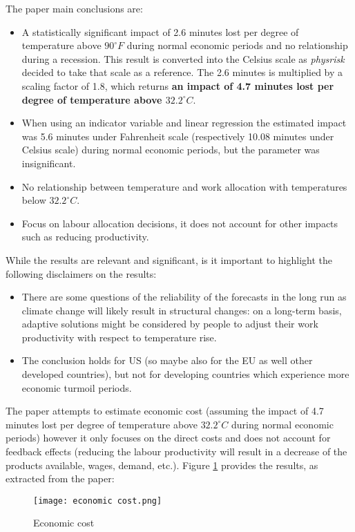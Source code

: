 \documentclass{article}
\begin{document}
The paper main conclusions are:
\begin{itemize}
    \item A statistically significant impact of 2.6 minutes lost per degree of temperature above $90^\circ F$ during normal economic periods and no relationship during a recession. This result is converted into the Celsius scale as \emph{physrisk} decided to take that scale as a reference. The 2.6 minutes is multiplied by a scaling factor of 1.8, which returns \textbf{an impact of 4.7 minutes lost per degree of temperature above $32.2^\circ C$}. 
    \item When using an indicator variable and linear regression the estimated impact was 5.6 minutes under Fahrenheit scale (respectively 10.08 minutes under Celsius scale) during normal economic periods, but the parameter was insignificant. 
    \item No relationship between temperature and work allocation with temperatures below  $32.2^\circ C$. 
    \item Focus on labour allocation decisions, it does not account for other impacts such as reducing productivity. 
\end{itemize}

While the results are relevant and significant, is it important to highlight the following disclaimers on the results:
\begin{itemize}
    \item There are some questions of the reliability of the forecasts in the long run as climate change will likely result in structural changes: on a long-term basis, adaptive solutions might be considered by people to adjust their work productivity with respect to temperature rise.
    \item The conclusion holds for US (so maybe also for the EU as well other developed countries), but not for developing countries which experience more economic turmoil periods.
\end{itemize}

The paper attempts to estimate economic cost (assuming the impact of 4.7 minutes lost per degree of temperature above $32.2^\circ C$ during normal economic periods) however it only focuses on the direct costs and does not account for feedback effects (reducing the labour productivity will result in a decrease of the products available, wages, demand, etc.). Figure \ref{fig:economiccost} provides the results, as extracted from the paper:
\begin{figure}[h]
    \centering
    \texttt{[image: economic cost.png]}
    \caption{Economic cost}
    \label{fig:economiccost}
\end{figure}
\end{document}
